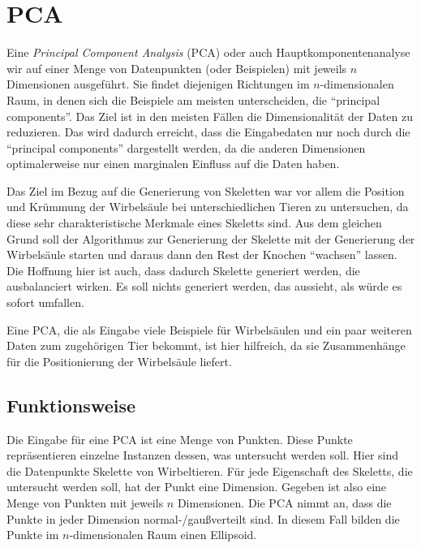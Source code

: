 \chapter{PCA}



 Eine \emph{Principal Component Analysis} (PCA) oder auch Hauptkomponentenanalyse wir auf einer Menge von Datenpunkten (oder Beispielen) mit jeweils $n$ Dimensionen ausgeführt. Sie findet diejenigen Richtungen im $n$-dimensionalen Raum, in denen sich die Beispiele am meisten unterscheiden, die "`principal components"'. Das Ziel ist in den meisten Fällen die Dimensionalität der Daten zu reduzieren. Das wird dadurch erreicht, dass die Eingabedaten nur noch durch die "`principal components"' dargestellt werden, da die anderen Dimensionen optimalerweise nur einen marginalen Einfluss auf die Daten haben.
 
 Das Ziel im Bezug auf die Generierung von Skeletten war vor allem die Position und Krümmung der Wirbelsäule bei unterschiedlichen Tieren zu untersuchen, da diese sehr charakteristische Merkmale eines Skeletts sind. Aus dem gleichen Grund soll der Algorithmus zur Generierung der Skelette mit der Generierung der Wirbelsäule starten und daraus dann den Rest der Knochen "`wachsen"' lassen.
 Die Hoffnung hier ist auch, dass dadurch Skelette generiert werden, die ausbalanciert wirken. Es soll nichts generiert werden, das aussieht, als würde es sofort umfallen. 
 
 Eine PCA, die als Eingabe viele Beispiele für Wirbelsäulen und ein paar weiteren Daten zum zugehörigen Tier bekommt, ist hier hilfreich, da sie Zusammenhänge für die Positionierung der Wirbelsäule liefert.
 
 
 \section{Funktionsweise}
 
 
 Die Eingabe für eine PCA ist eine Menge von Punkten. Diese Punkte repräsentieren einzelne Instanzen dessen, was untersucht werden soll. Hier sind die Datenpunkte Skelette von Wirbeltieren. Für jede Eigenschaft des Skeletts, die untersucht werden soll, hat der Punkt eine Dimension. Gegeben ist also eine Menge von Punkten mit jeweils $n$ Dimensionen. Die PCA nimmt an, dass die Punkte in jeder Dimension normal-/gaußverteilt sind. In diesem Fall bilden die Punkte im $n$-dimensionalen Raum einen Ellipsoid.
 

